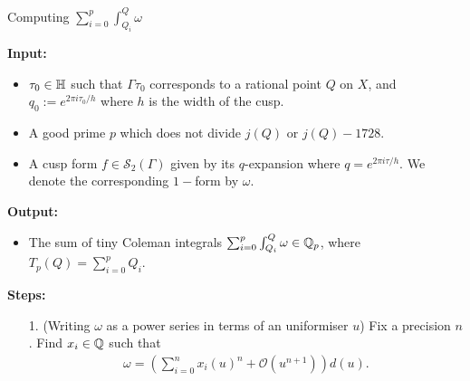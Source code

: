 \begin{algorithm}Computing $\sum_{i=0}^{p}\int^Q_{Q_i} \omega$\label{alg:tiny_integral}

\textbf{Input:}
\begin{itemize}
    \item $\tau_0 \in \mathbb{H}$ such that $\Gamma\tau_0$ corresponds to a rational point $Q$ on $X$, and $q_0 := e^{2\pi i \tau_0/h}$ where $h$ is the width of the cusp.
    \item A good prime $p$ which does not divide $j(Q)$ or $j(Q)-1728$. 
    \item A cusp form $f\in \mathcal{S}_2(\Gamma)$ given by its $q$-expansion where $q = e^{2\pi i \tau/h}$. We denote the corresponding $1-$form by $\omega$.


\end{itemize}

\textbf{Output:}
\begin{itemize}
    \item The sum of tiny Coleman integrals $\sum^p_{i=0}\int^Q_{Q_i} \omega \in \mathbb{Q}_p$, where $T_p(Q) = \sum_{i=0}^p Q_i$.
\end{itemize}

\textbf{Steps:}
\begin{enumerate}
\item[1.] \label{algstep:tiny_1} (Writing $\omega$ as a power series in terms of an uniformiser $u$) Fix a precision $n$. Find $x_i \in \mathbb{Q}$ such that
\begin{align} \label{eq:omega_j_exp}
    \omega = (\sum_{i=0}^n x_i(u)^n + \mathcal{O}(u^{n+1}))d(u).
\end{align}


\end{enumerate}
\end{algorithm}

